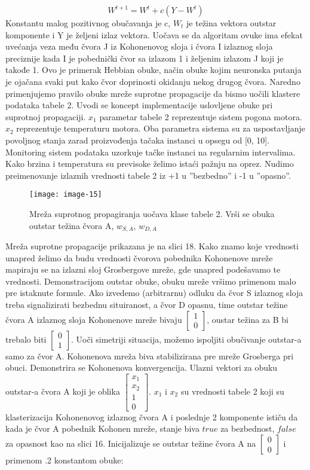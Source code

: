 \documentclass[fontsize=11bp, paper=a4]{scrarticle}
\begin{document}
$$ W^{ t + 1 } = W^t + c(Y - W^{t})$$
Konstantu malog pozitivnog obučavanja je c, $W_t$ je težina vektora outstar komponente i Y je željeni izlaz vektora. Uočava se da algoritam ovuke ima efekat uvećanja veza među čvora J iz Kohonenovog sloja i čvora I izlaznog sloja preciznije kada I je pobednički čvor sa izlazom 1 i željenim izlazom J koji je takođe 1. Ovo je primerak Hebbian obuke, način obuke kojim neuronska putanja je ojačana svaki put kako čvor doprinosti okidanju nekog drugog čvora. Naredno primenjujemo pravilo obuke mreže suprotne propagacije da bismo uočili klastere podataka tabele 2. Uvodi se koncept implementacije uslovljene obuke pri suprotnoj propagaciji. $x_1$ parametar tabele 2 reprezentuje sistem pogona motora. $x_2$ reprezentuje temperaturu motora. Oba parametra sistema su za uspostavljanje povoljnog stanja zarad proizvođenja tačaka instanci u opsegu od [0, 10]. Monitoring sistem podataka uzorkuje tačke instanci na regularnim intervalima. Kako brzina i temperatura su previsoke želimo istaći pažnju na oprez. Nudimo preimenovanje izlaznih vrednosti tabele 2 iz +1 u ''bezbedno'' i -1 u ''opasno''.

\begin{figure}[h!]
    \centering
    \texttt{[image: image-15]}
    \caption{Mreža suprotnog propagiranja uočava klase tabele 2. Vrši se obuka outstar težina čvora A, $w_{S,A}$, $w_{D,A}$}
\end{figure}

Mreža suprotne propagacije prikazana je na slici 18. Kako znamo koje vrednosti unapred želimo da budu vrednosti čvorova pobednika Kohonenove mreže mapiraju se na izlazni sloj Grosbergove mreže, gde unapred podešavamo te vrednosti. Demonstracijom outstar obuke, obuku mreže vršimo primenom malo pre istaknute formule. Ako izvedemo (arbitrarnu) odluku da čvor S izlaznog sloja treba signalizirati bezbednu situiranost, a čvor D opasnu, time outstar težine čvora A izlaznog sloja Kohonenove mreže bivaju $\begin{bmatrix} 1 \\ 0 \end{bmatrix}$, oustar težina za B bi trebalo biti $\begin{bmatrix} 0 \\ 1 \end{bmatrix}$. Uoči simetriji situacija, možemo ispoljiti obučivanje outstar-a samo za čvor A. Kohonenova mreža biva stabilizirana pre mreže Grosberga pri obuci. Demonstrira se Kohonenova konvergencija. Ulazni vektori za obuku outstar-a čvora A koji je oblika $\begin{bmatrix} x_1 \\ x_2 \\ 1 \\ 0 \end{bmatrix}$. $x_1$ i $x_2$ su vrednosti tabele 2  koji su klasterizacija Kohonenovog izlaznog čvora A i poslednje 2 komponente ističu da kada je čvor A pobednik Kohonen mreže, stanje biva $true$ za bezbednost, $false$ za opasnost kao na slici 16.
Inicijalizuje se outstar težine čvora A na $\begin{bmatrix} 0 \\ 0 \end{bmatrix}$ i primenom .2 konstantom obuke:
\end{document}
